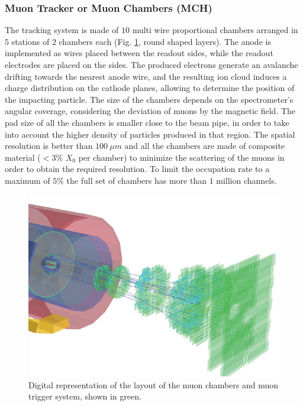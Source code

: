 \subsubsection{Muon Tracker or Muon Chambers (MCH)}
The tracking system is made of $10$ multi wire proportional chambers arranged in $5$ stations of $2$ chambers each (Fig. \ref{fig:mch_mtr}, round shaped layers).
The anode is implemented as wires placed between the readout sides, while the readout electrodes are placed on the sides.
The produced electrons generate an avalanche drifting towards the nearest anode wire, and the resulting ion cloud induces a charge distribution on the cathode planes, allowing to determine the position of the impacting particle.
The size of the chambers depends on the spectrometer’s angular coverage, considering the deviation of muons by the magnetic field.
The pad size of all the chambers is smaller close to the beam pipe, in order to take into account the higher density of particles produced in that region.
The spatial resolution is better than $100\ \mu m$ and all the chambers are made of composite material ($< 3\%$ $X_0$ per chamber) to minimize the scattering of the muons in order to obtain the required resolution. 
To limit the occupation rate to a maximum of $5\%$ the full set of chambers has more than $1$ million channels.

\begin{figure}[!h]
\begin{center}
\includegraphics[width=\linewidth]{Chapters/Introduction/Figs/muon_mtr_mch.jpg}
\caption{Digital representation of the layout of the muon chambers and muon trigger system, shown in green.}
\label{fig:mch_mtr}
\end{center}
\end{figure}

